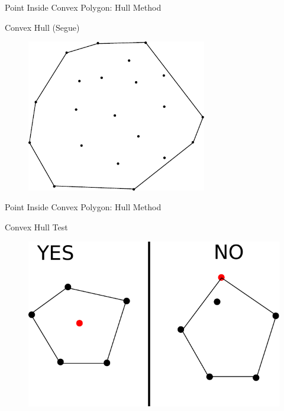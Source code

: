 \documentclass{beamer}
\begin{document}
\begin{frame}{Point Inside Convex Polygon: Hull Method}

Convex Hull (Segue) 

\begin{figure}[t]
	\centering
	\includegraphics[width=0.7\textwidth]{ConvexHullExample2.pdf}
\end{figure}


\end{frame}

\begin{frame}{Point Inside Convex Polygon: Hull Method}

Convex Hull Test

\begin{figure}[t]
	\centering
	\includegraphics[width=\textwidth]{ConvexHullTest.pdf}
\end{figure}

\end{frame}
\end{document}
